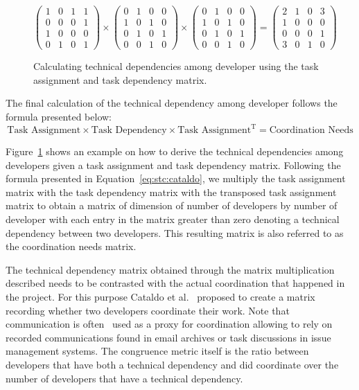 \begin{figure}[t!]
\centering
\[
\left(
\begin{matrix}
1 & 0 & 1 & 1\\
0 & 0 & 0 & 1\\
1 & 0 & 0 & 0\\
0 & 1 & 0 & 1
\end{matrix}
\right)
\times
\left(
\begin{matrix}
0 & 1 & 0 & 0\\
1 & 0 & 1 & 0\\
0 & 1 & 0 & 1\\
0 & 0 & 1 & 0
\end{matrix}
\right)
\times
\left(
\begin{matrix}
0 & 1 & 0 & 0\\
1 & 0 & 1 & 0\\
0 & 1 & 0 & 1\\
0 & 0 & 1 & 0
\end{matrix}
\right)
=
\left(
\begin{matrix}
2 & 1 & 0 & 3\\
1 & 0 & 0 & 0\\
0 & 0 & 0 & 1\\
3 & 0 & 1 & 0
\end{matrix}
\right)
\]
\caption{Calculating technical dependencies among developer using the task assignment and task dependency matrix.}
\label{chap:3:fig:example:stc:cataldo}
\end{figure}
The final calculation of the technical dependency among developer follows the formula presented below:
\begin{equation}
\label{eq:stc:cataldo}
\text{Task Assignment} \times \text{Task Dependency} \times \text{Task Assignment}^{\text{T}} = \text{Coordination Needs}
\end{equation}

Figure~\ref{chap:3:fig:example:stc:cataldo} shows an example on how to derive the technical dependencies among developers given a task assignment and task dependency matrix.
Following the formula presented in Equation~\ref{eq:stc:cataldo}, we multiply the task assignment matrix with the task dependency matrix with the transposed task assignment matrix to obtain a matrix of dimension of number of developers by number of developer with each entry in the matrix greater than zero denoting a technical dependency between two developers.
This resulting matrix is also referred to as the coordination needs matrix.

The technical dependency matrix obtained through the matrix multiplication described needs to be contrasted with the actual coordination that happened in the project.
For this purpose Cataldo et al.~\cite{cataldo:cscw:2006} proposed to create a matrix recording whether two developers coordinate their work.
Note that communication is often~\cite{cataldo:cscw:2006,kwan:tse:2011,valetto:msr:2007,ducheneaut:cscw:2005,ehrlich:stc:2008,wolf:icse:2009} used as a proxy for coordination allowing to rely on recorded communications found in email archives or task discussions in issue management systems.
The congruence metric itself is the ratio between developers that have both a technical dependency and did coordinate over the number of developers that have a technical dependency.

